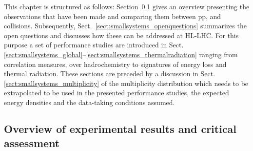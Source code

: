 \documentclass[../report.tex]{subfiles}
\begin{document}
This chapter is structured as follows: Section~\ref{sect:smallsystems_historicoverview} gives an overview presenting the observations that have been made and comparing them between pp, \pPb and \PbPb collisions. Subsequently, Sect.~\ref{sect:smallsystems_openquestions} summarizes the open questions and discusses how these can be addressed at HL-LHC. 
For this purpose a set of performance studies are introduced in Sect.\ref{sect:smallsystems_global}--\ref{sect:smallsystems_thermalradiation} ranging from correlation measures, over hadrochemistry to signatures of energy loss and thermal radiation. These sections are preceded by a discussion in Sect.\ref{sect:smallsystems_multiplicity} of the multiplicity distribution which needs to be extrapolated to be used in the presented performance studies, the expected energy densities and the data-taking conditions assumed.

\subsection{Overview of experimental results and critical assessment}
\label{sect:smallsystems_historicoverview}
\end{document}

